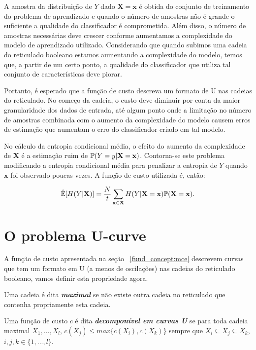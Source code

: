 A amostra da distribuição de $Y$ dado $\mathbf{X = x}$ é obtida do 
conjunto de treinamento do problema de aprendizado e quando o número
de amostras não é grande o suficiente a qualidade do classificador 
é comprometida. Além disso, o número de amostras necessárias deve
crescer conforme aumentamos a complexidade do modelo de aprendizado 
utilizado. Considerando que quando subimos uma cadeia do reticulado 
booleano estamos aumentando a complexidade do modelo, temos que, a
partir de um certo ponto, a qualidade do classificador que utiliza tal 
conjunto de características deve piorar. 

Portanto, é esperado que a função de custo descreva um formato de U nas 
cadeias do reticulado. No começo da cadeia, o custo deve diminuir por 
conta da maior granularidade dos dados de entrada, até algum ponto onde
a limitação no número de amostras combinada com o aumento da 
complexidade do modelo causem erros de estimação que aumentam o erro
do classificador criado em tal modelo.

No cálculo da entropia condicional média, o efeito do aumento da 
complexidade de $\mathbf X$ é a estimação ruim de 
$\mathbb{P} (Y = y | \mathbf{X = x})$. Contorna-se este problema 
modificando a entropia condicional média para penalizar a entropia de 
$Y$ quando $\mathbf{x}$ foi observado poucas vezes. A função de custo
utilizada é, então:

\begin{equation} \label{cost_function:mce}
    \hat{\mathbb{E}}[H (Y | \mathbf{X})] = \frac{N}{t}
    \sum_{\mathbf{x} \in \mathbf{X}} H (Y | \mathbf{X = x}) \mathbb{P} (\mathbf{X = x}).
\end{equation}

\section{O problema U-curve}
A função de custo apresentada na seção ~\ref{fund_concept:mce}
descrevem curvas que tem um formato em U (a menos de oscilações) nas 
cadeias do reticulado booleano, vamos definir esta propriedade agora.

\begin{mydefinition}
Uma cadeia é dita {\bf \em maximal} se não existe outra cadeia no 
reticulado que contenha propriamente esta cadeia.
\end{mydefinition}

\begin{mydefinition}\label{fund_concepts:ushape}
Uma função de custo $c$ é dita {\bf \em decomponível em curvas U} se
para toda cadeia maximal $X_1, ..., X_l$, $c(X_j) \leq max \{c (X_i),
c (X_k)\}$ sempre que $X_i \subseteq X_j \subseteq X_k$, $i, j, k \in 
\{1, ..., l\}$.
\end{mydefinition}

